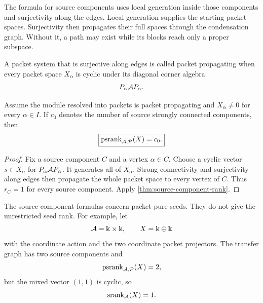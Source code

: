 \begin{hypothesisguide}
The formula for source components uses local generation inside those components and surjectivity along the edges.  Local generation supplies the starting packet spaces.  Surjectivity then propagates their full spaces through the condensation graph.  Without it, a path may exist while its blocks reach only a proper subspace.
\end{hypothesisguide}


\begin{definition}
\label{def:packet-propagating}
A packet system that is surjective along edges is called packet propagating when every packet space $X_\alpha$ is cyclic under its diagonal corner algebra
\[
P_\alpha\mathcal A P_\alpha.
\]
\end{definition}

\begin{corollary}
\label{cor:source-component-count}
Assume the module resolved into packets is packet propagating and $X_\alpha\neq0$ for every $\alpha\in I$.  If $c_0$ denotes the number of source strongly connected components, then
\[
\boxed{
\operatorname{psrank}_{\mathcal A,\mathcal P}(X)=c_0.
}
\]
\end{corollary}

\begin{proof}
Fix a source component $C$ and a vertex $\alpha\in C$.  Choose a cyclic vector $s\in X_\alpha$ for $P_\alpha\mathcal A P_\alpha$.  It generates all of $X_\alpha$.  Strong connectivity and surjectivity along edges then propagate the whole packet space to every vertex of $C$.  Thus $r_C=1$ for every source component.  Apply \cref{thm:source-component-rank}.
\end{proof}

\begin{boundary}
\label{bnd:packet-pure-boundary}
The source component formulas concern packet pure seeds.  They do not give the unrestricted seed rank.  For example, let
\[
\mathcal A=\Bbbk\times\Bbbk,
\qquad
X=\Bbbk\oplus\Bbbk
\]
with the coordinate action and the two coordinate packet projectors.  The transfer graph has two source components and
\[
\operatorname{psrank}_{\mathcal A,\mathcal P}(X)=2,
\]
but the mixed vector $(1,1)$ is cyclic, so
\[
\operatorname{srank}_{\mathcal A}(X)=1.
\]
\end{boundary}

